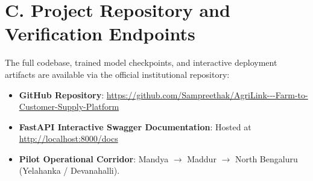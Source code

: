 {\section*{C. Project Repository and Verification Endpoints}
\label{sec:appendix_repo}
The full codebase, trained model checkpoints, and interactive deployment artifacts are available via the official institutional repository:
\begin{itemize}
	\item \textbf{GitHub Repository}: \url{https://github.com/Sampreethak/AgriLink---Farm-to-Customer-Supply-Platform}
	\item \textbf{FastAPI Interactive Swagger Documentation}: Hosted at \url{http://localhost:8000/docs}
	\item \textbf{Pilot Operational Corridor}: Mandya $\rightarrow$ Maddur $\rightarrow$ North Bengaluru (Yelahanka / Devanahalli).
\end{itemize}

\chapterend
}